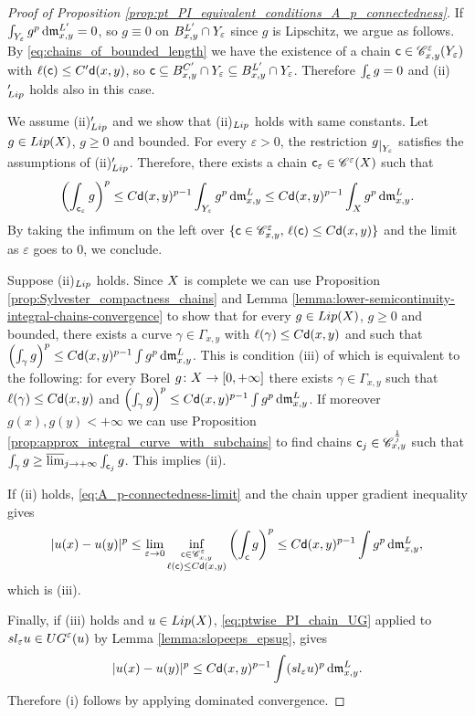 \documentclass[12pt]{amsart}
\newcommand{\sfd}{{\sf d}}
\renewcommand{\d}{{\mathrm d}}
\newcommand{\restr}[1]{\lower3pt\hbox{$|_{#1}$}}
\newcommand{\lims}{\varlimsup}
\newcommand{\X}{{\rm X}}
\newcommand{\Y}{{\rm Y}}
\newcommand{\Lip}{{\rm Lip}}
\newcommand{\mm}{\mathfrak m}
\theoremstyle{definition}
\newcommand{\sfc}{{\sf c}}
\newcommand{\Chain}[1]{\mathscr{C}^{#1}}
\renewcommand{\sl}[1]{{\rm sl}_{#1}}
\newcommand{\UG}[1]{{\rm UG}^{#1}}
\begin{document}
\begin{proof}[Proof of Proposition \ref{prop:pt_PI_equivalent_conditions_A_p_connectedness}]
    If $\int_{\Y_\varepsilon} g^p\,\d\mm_{x,y}^{L'} = 0$, so $g\equiv 0$ on $B_{x,y}^{L'} \cap \Y_\varepsilon$ since $g$ is Lipschitz, we argue as follows. By \eqref{eq:chains_of_bounded_length} we have the existence of a chain $\sfc \in \Chain{\varepsilon}_{x,y}(\Y_\varepsilon)$ with $\ell(\sfc) \le C'\sfd(x,y)$, so $\sfc \subseteq B_{x,y}^{C'} \cap \Y_\varepsilon \subseteq B_{x,y}^{L'} \cap \Y_\varepsilon$. Therefore $\int_{\sfc} g = 0$ and (ii)$'_\Lip$ holds also in this case.

    We assume (ii)$'_\Lip$ and we show that (ii)$_\Lip$ holds with same constants. Let $g\in \Lip(\X)$, $g\ge 0$ and bounded. For every $\varepsilon > 0$, the restriction $g\restr{\Y_\varepsilon}$ satisfies the assumptions of (ii)$'_\Lip$. Therefore, there exists a chain $\sfc_\varepsilon \in \Chain{\varepsilon}(\X)$ such that
    \begin{equation}
            \left(\int_{\sfc_\varepsilon} g\right)^p \le C\sfd(x,y)^{p-1}\int_{\Y_\varepsilon} g^p\,\d\mm_{x,y}^L \le C\sfd(x,y)^{p-1}\int_{\X} g^p\,\d\mm_{x,y}^L.
    \end{equation}
    By taking the infimum on the left over $\{ \sfc \in \Chain{\varepsilon}_{x,y},\, \ell(\sfc) \le C\sfd(x,y)\}$ and the limit as $\varepsilon$ goes to $0$, we conclude.

    Suppose (ii)$_\Lip$ holds. Since $\X$ is complete we can use Proposition \ref{prop:Sylvester_compactness_chains} and Lemma \ref{lemma:lower-semicontinuity-integral-chains-convergence} to show that for every $g\in \Lip(\X)$, $g\ge 0$ and bounded, there exists a curve $\gamma \in \Gamma_{x,y}$ with $\ell(\gamma) \le C\sfd(x,y)$ and such that $\left(\int_\gamma g\right)^p \le C \sfd(x,y)^{p-1}\int g^p \,\d\mm_{x,y}^L$. This is condition (iii) of \cite[Theorem A.3]{CaputoCavallucci2024II} which is equivalent to the following: for every Borel $g\colon \X \to [0,+\infty]$ there exists $\gamma \in \Gamma_{x,y}$ such that $\ell(\gamma) \le C\sfd(x,y)$ and $\left(\int_\gamma g\right)^p \le C \sfd(x,y)^{p-1}\int g^p \,\d\mm_{x,y}^L$. If moreover $g(x), g(y) < +\infty$ we can use Proposition \ref{prop:approx_integral_curve_with_subchains} to find chains $\sfc_j \in \Chain{\frac{1}{j}}_{x,y}$ such that $\int_\gamma g \ge \lims_{j\to +\infty} \int_{\sfc_j}g$.     
    This implies (ii).
    
    If (ii) holds, \eqref{eq:A_p-connectedness-limit} and the chain upper gradient inequality gives
    $$\vert u(x) - u(y) \vert^p \le \lim_{\varepsilon \to 0} \inf_{\substack{\sfc \in \Chain{\varepsilon}_{x,y}\\ \ell(\sfc) \le C\sfd(x,y)}} \left(\int_{\sfc} g\right)^p \le C\sfd(x,y)^{p-1}\int g^p\,\d\mm_{x,y}^L,$$
    which is (iii).

    Finally, if (iii) holds and $u \in {\rm Lip}(\X)$, \eqref{eq:ptwise_PI_chain_UG} applied to $\sl{\varepsilon}u \in \UG{\varepsilon}(u)$ by Lemma \ref{lemma:slopeeps_epsug}, gives
    $$\vert u(x) - u(y) \vert^p \le C\sfd(x,y)^{p-1} \int (\sl{\varepsilon}u)^p\,\d\mm_{x,y}^L.$$
    Therefore (i) follows by applying dominated convergence.
\end{proof}
\end{document}

